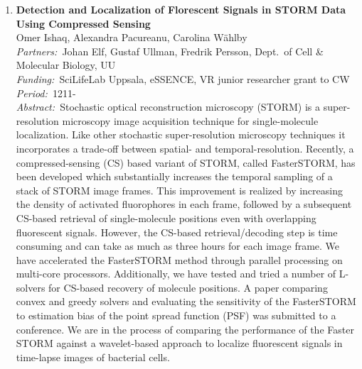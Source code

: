 \documentclass[10pt, a4paper]{article}
\newcommand{\aabstract}[1]{\emph{Abstract:~}#1}
\newcommand{\ffunding}[1]{\emph{Funding:~}#1\\}
\newcommand{\ppartners}[1]{\emph{Partners:~}#1\\}
\newcommand{\pperiod}[1]{\emph{Period:~}#1\\}
\begin{document}
\begin{enumerate}
\vspace*{-2mm}
\item 
\textbf{Detection and Localization of Florescent Signals in STORM Data Using Compressed Sensing}\\
Omer Ishaq, Alexandra Pacureanu, Carolina W\"{a}hlby\\
\ppartners{Johan Elf, Gustaf Ullman, Fredrik Persson, Dept.~of Cell \& Molecular Biology, UU}
\ffunding{SciLifeLab Uppsala, eSSENCE, VR junior researcher grant to CW}
\pperiod{1211-}
\aabstract{Stochastic optical reconstruction microscopy (STORM) is a super-resolution microscopy image acquisition technique for single-molecule localization. Like other stochastic super-resolution microscopy techniques it incorporates a trade-off between spatial- and temporal-resolution. Recently, a compressed-sensing (CS) based variant of STORM, called FasterSTORM, has been developed which substantially increases the temporal sampling of a stack of STORM image frames. This improvement is realized by increasing the density of activated fluorophores in each frame, followed by a subsequent CS-based retrieval of single-molecule positions even with overlapping fluorescent signals.  However, the CS-based retrieval/decoding step is time consuming and can take as much as three hours for each image frame. We have accelerated the FasterSTORM method through parallel processing on multi-core processors. Additionally, we have tested and tried a number of L\raisebox{-.4ex}{\scriptsize 1}-solvers for CS-based recovery of molecule positions. A paper comparing convex and greedy solvers and evaluating the sensitivity of the FasterSTORM to estimation bias of the point spread function (PSF) was submitted to a conference. We are in the process of comparing the performance of the Faster STORM against a wavelet-based approach to localize fluorescent signals in time-lapse images of bacterial cells.}



\end{enumerate}
\end{document}
